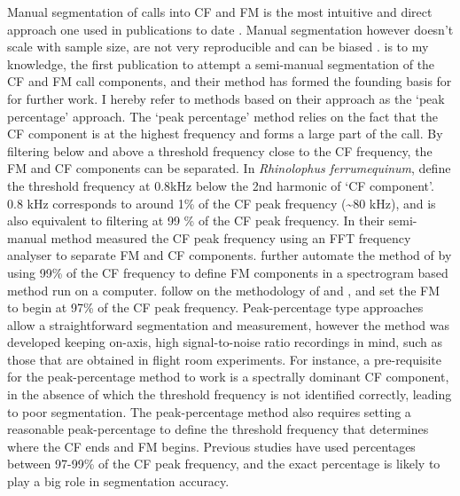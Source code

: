 \documentclass[
]{book}
\begin{document}
Manual segmentation of calls into CF and FM is the most intuitive and direct approach one used in publications to date \citep{vater2003development, fawcett2015echolocation, gessinger2019unusual}. Manual segmentation however doesn't scale with sample size, are not very reproducible and can be biased \citep{brumm2017measurement}. \citet{tian1997echolocation} is to my knowledge, the first publication to attempt a semi-manual segmentation of the CF and FM call components, and their method has formed the founding basis for for further work. I hereby refer to methods based on their approach as the `peak percentage' approach. The `peak percentage' method relies on the fact that the CF component is at the highest frequency and forms a large part of the call. By filtering below and above a threshold frequency close to the CF frequency, the FM and CF components can be separated. In \emph{Rhinolophus ferrumequinum}, \citet{tian1997echolocation} define the threshold frequency at 0.8kHz below the 2nd harmonic of `CF component'. 0.8 kHz corresponds to around 1\% of the CF peak frequency (\textasciitilde80 kHz), and is also equivalent to filtering at 99 \% of the CF peak frequency. In their semi-manual method \citet{tian1997echolocation} measured the CF peak frequency using an FFT frequency analyser to separate FM and CF components. \citet{schoeppler2018precise} further automate the method of \citet{tian1997echolocation} by using 99\% of the CF frequency to define FM components in a spectrogram based method run on a computer. \citet{lu2020echolocating} follow on the methodology of \citet{schoeppler2018precise} and \citet{tian1997echolocation}, and set the FM to begin at 97\% of the CF peak frequency. Peak-percentage type approaches allow a straightforward segmentation and measurement, however the method was developed keeping on-axis, high signal-to-noise ratio recordings in mind, such as those that are obtained in flight room experiments. For instance, a pre-requisite for the peak-percentage method to work is a spectrally dominant CF component, in the absence of which the threshold frequency is not identified correctly, leading to poor segmentation. The peak-percentage method also requires setting a reasonable peak-percentage to define the threshold frequency that determines where the CF ends and FM begins. Previous studies have used percentages between 97-99\% of the CF peak frequency, and the exact percentage is likely to play a big role in segmentation accuracy.
\end{document}
